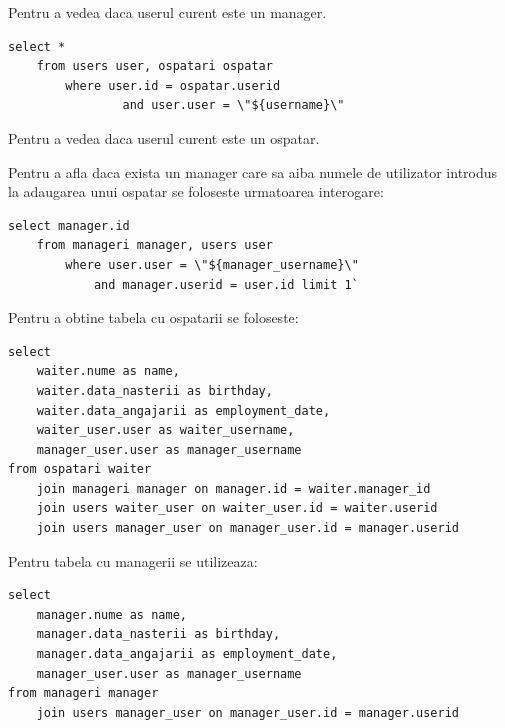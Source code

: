 \documentclass[12pt,english]{article}
\begin{document}
\begin{flushleft}
Pentru a vedea daca userul curent este un manager.
\end{flushleft}

\begin{lstlisting}
select * 
    from users user, ospatari ospatar
        where user.id = ospatar.userid
                and user.user = \"${username}\"
\end{lstlisting}

\begin{flushleft}
Pentru a vedea daca userul curent este un ospatar.
\end{flushleft}

\begin{flushleft}
Pentru a afla daca exista un manager care sa aiba numele de utilizator introdus la adaugarea unui ospatar se foloseste urmatoarea interogare:
\end{flushleft}

\begin{lstlisting}
select manager.id
    from manageri manager, users user
        where user.user = \"${manager_username}\"
            and manager.userid = user.id limit 1`
\end{lstlisting}

\begin{flushleft}
Pentru a obtine tabela cu ospatarii se foloseste:
\end{flushleft}

\begin{lstlisting}
select
    waiter.nume as name,
    waiter.data_nasterii as birthday,
    waiter.data_angajarii as employment_date,
    waiter_user.user as waiter_username,
    manager_user.user as manager_username
from ospatari waiter
    join manageri manager on manager.id = waiter.manager_id
    join users waiter_user on waiter_user.id = waiter.userid
    join users manager_user on manager_user.id = manager.userid
\end{lstlisting}

\begin{flushleft}
Pentru tabela cu managerii se utilizeaza:
\end{flushleft}

\begin{lstlisting}
select
    manager.nume as name,
    manager.data_nasterii as birthday,
    manager.data_angajarii as employment_date,
    manager_user.user as manager_username
from manageri manager
    join users manager_user on manager_user.id = manager.userid
\end{lstlisting}
\end{document}
